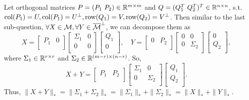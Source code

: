 Let orthogonal matrices $P=(P_1\ P_2)\in\real^{m\times m}$ and
$Q=(Q_1^T\ Q_2^T)^T\in{\mathbb{R}}^{n\times n}$, s.t.
${\text{col}}(P_1)=U, {\text{col}}(P_1) = U^\perp, {\text{row}}(Q_1) = V, {\text{row}}(Q_2)=V^\perp$.
Then similar to the last sub-question,
$\forall X\in{\mathcal{M}}, \forall Y\in{\overline{{\mathcal{M}}}}^\perp$,
we can decompose them as
\begin{equation}
    X =
        \begin{bmatrix}
        P_1 & 0\\
        \end{bmatrix}
        \begin{bmatrix}
        \Sigma_1 &   0 \\
        0 & 0\\
        \end{bmatrix}
        \begin{bmatrix}
        Q_1 \\
        0 \\
        \end{bmatrix},\quad
        Y =
        \begin{bmatrix}
        0 & P_2\\
        \end{bmatrix}
        \begin{bmatrix}
        0 &   0 \\
        0 & \Sigma_2\\
        \end{bmatrix}
        \begin{bmatrix}
        0 \\
        Q_2 \\
        \end{bmatrix},
\end{equation}
where $\Sigma_1\in{\mathbb{R}}^{r\times r}$ and $\Sigma_2\in{\mathbb{R}}^{(m-r)\times(n-r)}$.
So,
\begin{equation}
    X + Y =
        \begin{bmatrix}
        P_1 & P_2\\
        \end{bmatrix}
        \begin{bmatrix}
        \Sigma_1 &   0 \\
        0 & \Sigma_2\\
        \end{bmatrix}
        \begin{bmatrix}
        Q_1 \\
        Q_2 \\
        \end{bmatrix}.
\end{equation}
Thus,
$\|X+Y\|_*=\|\Sigma_1+\Sigma_2\|_*=\|\Sigma_1\|_*+\|\Sigma_2\|_*=\|X\|_*+\|Y\|_*$.
